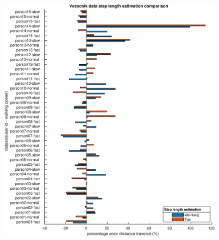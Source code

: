 \begin{figure}[H]
	\centering
	\includegraphics[width=\linewidth]{images/20201113_1943_wienberg_vs_tian_vezocnik_data_1}
	\caption{}
	\label{fig:202011131943_wienberg_vs_tian_vezocnik_data1}
\end{figure}
 
